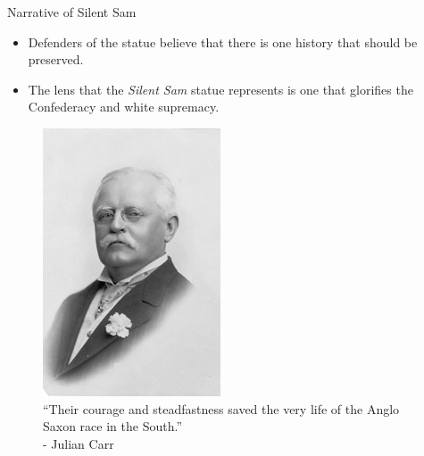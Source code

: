 \documentclass[10pt]{beamer}
\begin{document}
\begin{frame}{Narrative of Silent Sam}
    \begin{minipage}{0.5\textwidth}
    \begin{itemize}
        \item Defenders of the statue believe that there is one history that should be preserved. 
        \item The lens that the \textit{Silent Sam} statue represents       is one that glorifies the Confederacy and white supremacy.
    \end{itemize}
    \end{minipage}
    \begin{minipage}{0.4\textwidth}
        \begin{figure}
            \centering
            \includegraphics[scale = 2]{photos/photo5.jpg}
            \caption{``Their courage and steadfastness saved the very life of the Anglo Saxon race in the South.'' \\ - Julian Carr}
        \end{figure}
    \end{minipage}
\end{frame}
\end{document}
